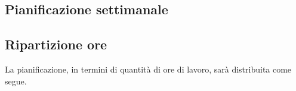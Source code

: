 
\subsection{Pianificazione settimanale}
	\prospettoSettimanale
	\newpage
	
\subsection{Ripartizione ore}
	La pianificazione, in termini di quantità di ore di lavoro, sarà distribuita come segue.
	\begin{center}
	    
	\end{center}
